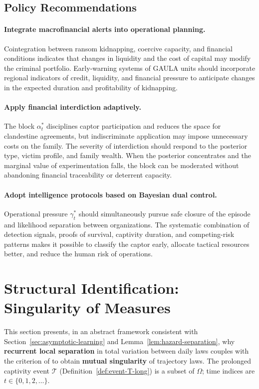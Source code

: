 \documentclass[12pt,a4paper]{article}
\providecommand{\textcite}{\citet}
\theoremstyle{plain}
\theoremstyle{definition}
\theoremstyle{remark}
\newcommand{\1}{\mathbf{1}}
\begin{document}
\subsection{Policy Recommendations}

\paragraph{Integrate macrofinancial alerts into operational planning.}
Cointegration between ransom kidnapping, coercive capacity, and financial conditions
indicates that changes in liquidity and the cost of capital may modify the criminal
portfolio. Early-warning systems of GAULA units should incorporate regional indicators
of credit, liquidity, and financial pressure to anticipate changes in the expected
duration and profitability of kidnapping.

\paragraph{Apply financial interdiction adaptively.}
The block $\alpha_t^\ast$ disciplines captor participation and reduces the space for
clandestine agreements, but indiscriminate application may impose unnecessary costs on
the family. The severity of interdiction should respond to the posterior type, victim
profile, and family wealth. When the posterior concentrates and the marginal value of
experimentation falls, the block can be moderated without abandoning financial
traceability or deterrent capacity.

\paragraph{Adopt intelligence protocols based on Bayesian dual control.}
Operational pressure $\gamma_t^\ast$ should simultaneously pursue safe closure of the
episode and likelihood separation between organizations. The systematic combination of
detection signals, proofs of survival, captivity duration, and competing-risk patterns
makes it possible to classify the captor early, allocate tactical resources better, and
reduce the human risk of operations.

\section{Structural Identification: Singularity of Measures}
\label{app:general-id}

This section presents, in an abstract framework consistent with
Section~\ref{sec:asymptotic-learning} and Lemma~\ref{lem:hazard-separation}, why
\textbf{recurrent local separation} in total variation between daily laws couples with
the criterion of \textcite{Kakutani1948} to obtain \textbf{mutual singularity} of
trajectory laws. The prolonged captivity event $\mathcal{T}$
\textup{(Definition~\ref{def:event-T-long})} is a subset of $\Omega$; time indices are
$t\in\{0,1,2,\ldots\}$.
\end{document}

